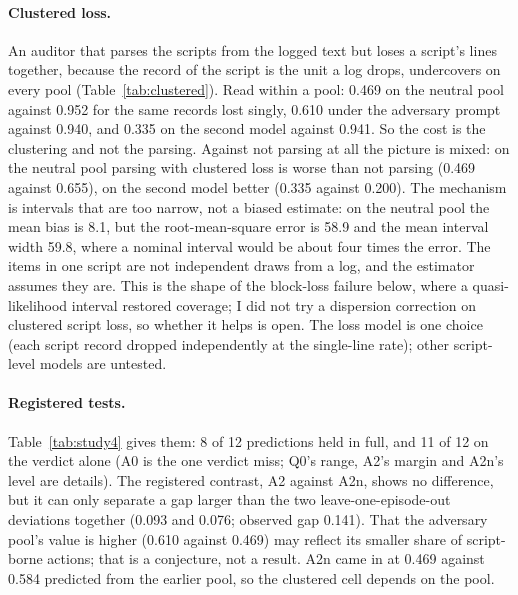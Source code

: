 \documentclass[11pt]{article}
\begin{document}
\paragraph{Clustered loss.} An auditor that parses the scripts from the logged text but
loses a script's lines together, because the record of the script is the unit a log drops,
undercovers on every pool (Table~\ref{tab:clustered}). Read within a pool: 0.469 on the
neutral pool against 0.952 for the same records lost singly, 0.610 under the adversary prompt
against 0.940, and 0.335 on the second model against 0.941. So the cost is the clustering
and not the parsing. Against not parsing at all the picture is mixed: on the neutral pool
parsing with clustered loss is worse than not parsing (0.469 against 0.655), on the second
model better (0.335 against 0.200). The mechanism is intervals that are too narrow, not a
biased estimate: on the neutral pool the mean bias is 8.1, but the root-mean-square error
is 58.9 and the mean interval width 59.8, where a nominal interval would be about four
times the error. The items in one script are not independent draws from a log, and the
estimator assumes they are. This is the shape of the block-loss failure below, where a
quasi-likelihood interval restored coverage; I did not try a dispersion correction on
clustered script loss, so whether it helps is open. The loss model is one choice (each
script record dropped independently at the single-line rate); other script-level models are
untested.

\begin{table}[h]
\centering\small

\caption{Study 4, \texttt{ll\_bic} coverage by what the auditor has and how a script's
records are lost.}
\label{tab:clustered}
\end{table}

\paragraph{Registered tests.} Table~\ref{tab:study4} gives them: 8 of 12 predictions held in
full, and 11 of 12 on the verdict alone (A0 is the one verdict miss; Q0's range, A2's margin
and A2n's level are details). The registered contrast, A2 against A2n, shows no difference,
but it can only separate a gap larger than the two leave-one-episode-out deviations
together (0.093 and 0.076; observed gap 0.141). That the adversary pool's value is higher
(0.610 against 0.469) may reflect its smaller share of script-borne actions; that is a
conjecture, not a result. A2n came in at 0.469 against 0.584 predicted from the earlier
pool, so the clustered cell depends on the pool.
\end{document}
